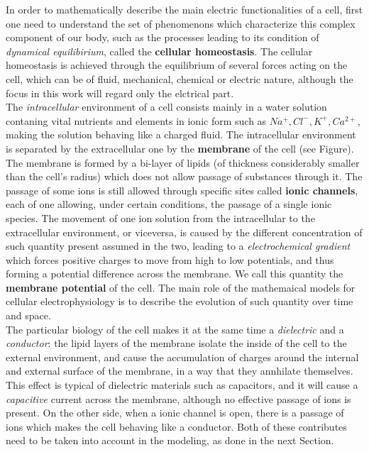 \documentclass[a4paper]{article}
\begin{document}
In order to mathematically describe the main electric functionalities of a cell, first one need  to understand the set of phenomenons which characterize this complex component of our body, such as the processes leading to its condition of \textit{dynamical equilibirium}, called the \textbf{cellular homeostasis}. The cellular homeostasis is achieved through the equilibrium of several forces acting on the cell, which can be of fluid, mechanical, chemical or electric nature, although the focus in this work will regard only the elctrical part.\\
The \textit{intracellular} environment of a cell consists mainly in a water solution contaning vital nutrients and elements in ionic form such as  $Na^+, Cl^-, K^+, Ca^{2+}$, making the solution behaving like a charged fluid. The intracellular environment is separated by the extracellular one by the \textbf{membrane} of the cell (see Figure). The membrane is formed by a bi-layer of lipids (of thickness considerably smaller than the cell's radius) which does not allow passage of substances through it. The passage of some ions is still allowed through specific sites called \textbf{ionic channels}, each of one allowing, under certain conditions, the passage of a single ionic species. The movement of one ion solution from the intracellular to the extracellular environment, or viceversa, is caused by the different concentration of such quantity present assumed in the two, leading to a \textit{electrochemical gradient} which forces positive charges to move from high to low potentials, and thus forming a potential difference across the membrane. We call this quantity the \textbf{membrane potential} of the cell. The main role of the mathemaical models for cellular electrophysiology is to describe the evolution of such quantity over time and space.
\\

The particular biology of the cell makes it at the same time a \textit{dielectric} and a \textit{conductor}: the lipid layers of the membrane isolate the inside of the cell to the external environment, and cause the accumulation of charges around the internal and external surface of the membrane, in a way that they annhilate themselves. This effect is typical of dielectric materials such as capacitors, and it will cause a \textit{capacitive} current across the membrane, although no effective passage of ions is present. On the other side, when a ionic channel is open, there is a passage of ions which makes the cell behaving like a conductor. Both of these contributes need to be taken into account in the modeling, as done in the next Section.
\\
\end{document}
